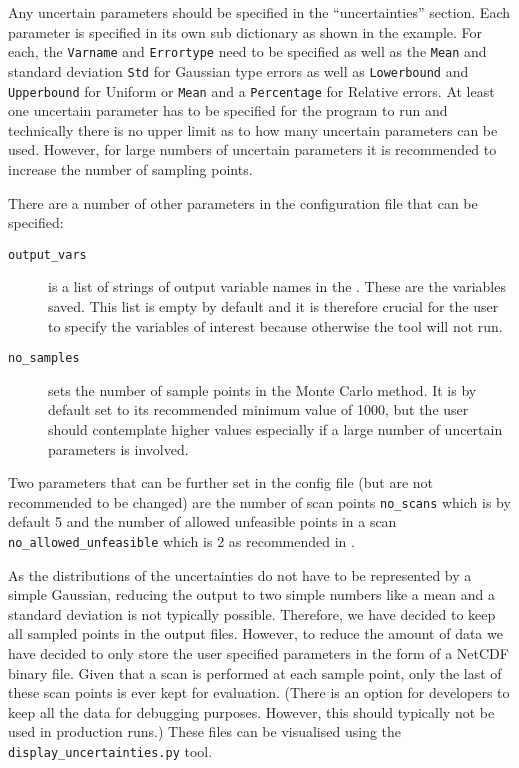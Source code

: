 Any uncertain parameters should be specified in the ``uncertainties''
section. Each parameter is specified in its own sub dictionary as shown in the
example. For each, the \texttt{Varname} and \texttt{Errortype} need to be
specified as well as the \texttt{Mean} and standard deviation \texttt{Std} for
Gaussian type errors as well as \texttt{Lowerbound} and \texttt{Upperbound}
for Uniform or \texttt{Mean} and a \texttt{Percentage} for Relative errors. At
least one uncertain parameter has to be specified for the program to run and
technically there is no upper limit as to how many uncertain parameters can be
used. However, for large numbers of uncertain parameters it is recommended to
increase the number of sampling points.

There are a number of other parameters in the configuration file that can be specified:
\begin{description}
\item[\texttt{output\_vars}] is a list of strings of output variable names in
  the \mfile. These are the variables saved. This list is empty by default and
  it is therefore crucial for the user to specify the variables of interest
  because otherwise the tool will not run.
\item[\texttt{no\_samples}] sets the number of sample points in the Monte
  Carlo method. It is by default set to its recommended minimum value of 1000,
  but the user should contemplate higher values especially if a large number
  of uncertain parameters is involved.
\end{description}
Two parameters that can be further set in the config file (but are not
recommended to be changed) are the number of scan points \texttt{no\_scans}
which is by default 5 and the number of allowed unfeasible points in a scan
\texttt{no\_allowed\_unfeasible} which is 2 as recommended in
\cite{WPPMI2014Report}.

As the distributions of the uncertainties do not have to be represented by a
simple Gaussian, reducing the output to two simple numbers like a mean and a
standard deviation is not typically possible. Therefore, we have decided to
keep all sampled points in the output files. However, to reduce the amount of
data we have decided to only store the user specified parameters in the form
of a NetCDF binary file. Given that a scan is performed at each sample point,
only the last of these scan points is ever kept for evaluation. (There is an
option for developers to keep all the data for debugging purposes. However,
this should typically not be used in production runs.) These files can be
visualised using the \texttt{display\_uncertainties.py} tool.



